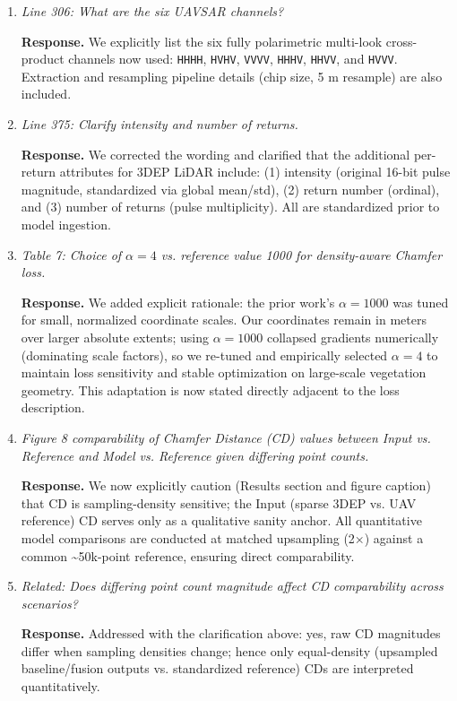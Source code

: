 \documentclass[11pt]{article}
\newcommand{\response}{\textbf{Response.} }
\begin{document}
\begin{enumerate}
  \item \emph{Line 306: What are the six UAVSAR channels?}

  \response We explicitly list the six fully polarimetric multi-look cross-product channels now used: \texttt{HHHH}, \texttt{HVHV}, \texttt{VVVV}, \texttt{HHHV}, \texttt{HHVV}, and \texttt{HVVV}. Extraction and resampling pipeline details (chip size, 5 m resample) are also included.

  \item \emph{Line 375: Clarify intensity and \emph{number of returns}.}

  \response We corrected the wording and clarified that the additional per-return attributes for 3DEP LiDAR include: (1) intensity (original 16-bit pulse magnitude, standardized via global mean/std), (2) return number (ordinal), and (3) number of returns (pulse multiplicity). All are standardized prior to model ingestion.

  \item \emph{Table 7: Choice of $\alpha=4$ vs. reference value 1000 for density-aware Chamfer loss.}

  \response We added explicit rationale: the prior work’s $\alpha=1000$ was tuned for small, normalized coordinate scales. Our coordinates remain in meters over larger absolute extents; using $\alpha=1000$ collapsed gradients numerically (dominating scale factors), so we re-tuned and empirically selected $\alpha=4$ to maintain loss sensitivity and stable optimization on large-scale vegetation geometry. This adaptation is now stated directly adjacent to the loss description.

  \item \emph{Figure 8 comparability of Chamfer Distance (CD) values between Input vs. Reference and Model vs. Reference given differing point counts.}

  \response We now explicitly caution (Results section and figure caption) that CD is sampling-density sensitive; the Input (sparse 3DEP vs. UAV reference) CD serves only as a qualitative sanity anchor. All quantitative model comparisons are conducted at matched upsampling (2×) against a common \textasciitilde50k-point reference, ensuring direct comparability.

  \item \emph{Related: Does differing point count magnitude affect CD comparability across scenarios?}

  \response Addressed with the clarification above: yes, raw CD magnitudes differ when sampling densities change; hence only equal-density (upsampled baseline/fusion outputs vs. standardized reference) CDs are interpreted quantitatively.


\end{enumerate}
\end{document}
